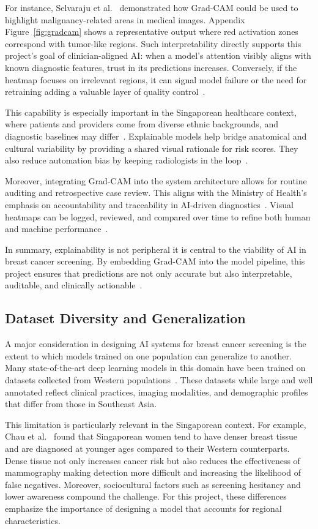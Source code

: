 \documentclass[12pt]{article}
\begin{document}
For instance, Selvaraju et al.~\cite{5} demonstrated how Grad-CAM could be used to highlight malignancy-related areas in medical images. Appendix Figure~\ref{fig:gradcam} shows a representative output where red activation zones correspond with tumor-like regions. Such interpretability directly supports this project’s goal of clinician-aligned AI: when a model’s attention visibly aligns with known diagnostic features, trust in its predictions increases. Conversely, if the heatmap focuses on irrelevant regions, it can signal model failure or the need for retraining adding a valuable layer of quality control~\cite{5}.

This capability is especially important in the Singaporean healthcare context, where patients and providers come from diverse ethnic backgrounds, and diagnostic baselines may differ~\cite{6}. Explainable models help bridge anatomical and cultural variability by providing a shared visual rationale for risk scores. They also reduce automation bias by keeping radiologists in the loop~\cite{3}.

Moreover, integrating Grad-CAM into the system architecture allows for routine auditing and retrospective case review. This aligns with the Ministry of Health’s emphasis on accountability and traceability in AI-driven diagnostics~\cite{6}. Visual heatmaps can be logged, reviewed, and compared over time to refine both human and machine performance~\cite{5}.

In summary, explainability is not peripheral it is central to the viability of AI in breast cancer screening. By embedding Grad-CAM into the model pipeline, this project ensures that predictions are not only accurate but also interpretable, auditable, and clinically actionable~\cite{5}.

\subsection{Dataset Diversity and Generalization}

A major consideration in designing AI systems for breast cancer screening is the extent to which models trained on one population can generalize to another. Many state-of-the-art deep learning models in this domain have been trained on datasets collected from Western populations~\cite{1}. These datasets while large and well annotated reflect clinical practices, imaging modalities, and demographic profiles that differ from those in Southeast Asia.

This limitation is particularly relevant in the Singaporean context. For example, Chau et al.~\cite{6} found that Singaporean women tend to have denser breast tissue and are diagnosed at younger ages compared to their Western counterparts. Dense tissue not only increases cancer risk but also reduces the effectiveness of mammography making detection more difficult and increasing the likelihood of false negatives. Moreover, sociocultural factors such as screening hesitancy and lower awareness compound the challenge. For this project, these differences emphasize the importance of designing a model that accounts for regional characteristics.
\end{document}
